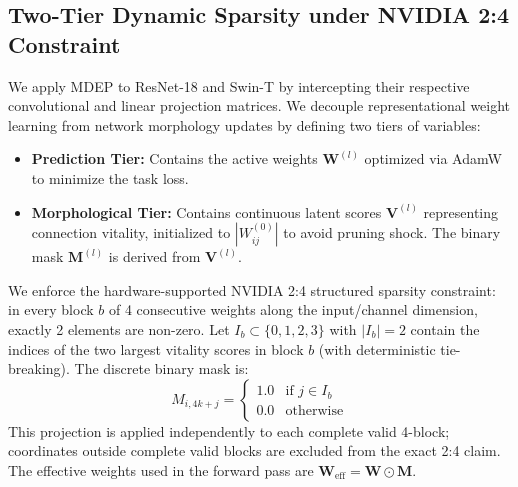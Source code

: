 \documentclass[letterpaper]{article} %
\begin{document}
\subsection{Two-Tier Dynamic Sparsity under NVIDIA 2:4 Constraint}
We apply MDEP to ResNet-18 and Swin-T by intercepting their respective convolutional and linear projection matrices. We decouple representational weight learning from network morphology updates by defining two tiers of variables:
\begin{itemize}
    \item \textbf{Prediction Tier:} Contains the active weights $\bm{W}^{(l)}$ optimized via AdamW to minimize the task loss.
    \item \textbf{Morphological Tier:} Contains continuous latent scores $\bm{V}^{(l)}$ representing connection vitality, initialized to $|W_{ij}^{(0)}|$ to avoid pruning shock. The binary mask $\bm{M}^{(l)}$ is derived from $\bm{V}^{(l)}$.
\end{itemize}
We enforce the hardware-supported NVIDIA 2:4 structured sparsity constraint: in every block $b$ of 4 consecutive weights along the input/channel dimension, exactly 2 elements are non-zero. Let $I_b \subset \{0, 1, 2, 3\}$ with $|I_b| = 2$ contain the indices of the two largest vitality scores in block $b$ (with deterministic tie-breaking). The discrete binary mask is:
\begin{equation}\label{eq:mask}
    M_{i, 4k+j} = \begin{cases}
        1.0 & \text{if } j \in I_b \\
        0.0 & \text{otherwise}
    \end{cases}
\end{equation}
This projection is applied independently to each complete valid 4-block; coordinates outside complete valid blocks are excluded from the exact 2:4 claim. The effective weights used in the forward pass are $\bm{W}_{\text{eff}} = \bm{W} \odot \bm{M}$.
\end{document}
